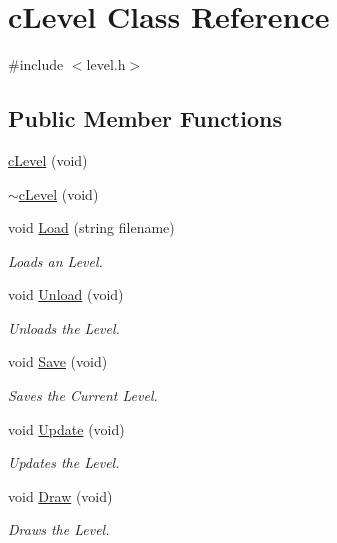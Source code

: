\hypertarget{classc_level}{\section{c\-Level Class Reference}
\label{classc_level}
}


{\ttfamily \#include $<$level.\-h$>$}

\subsection*{Public Member Functions}
\begin{DoxyCompactItemize}
\item 
\hyperlink{classc_level_a9a676d8850a8e55f88edc0630b3576d6}{c\-Level} (void)
\item 
\hyperlink{classc_level_ae4a0effc558ff476321a1d43bc88fd23}{$\sim$c\-Level} (void)
\item 
void \hyperlink{classc_level_a0585e5ce66c81057bc12da8e572f1cc4}{Load} (string filename)
\begin{DoxyCompactList}\small\item\em Loads an Level. \end{DoxyCompactList}\item 
void \hyperlink{classc_level_abe150afdc2a9fdf7a0df8d8b71cdf08e}{Unload} (void)
\begin{DoxyCompactList}\small\item\em Unloads the Level. \end{DoxyCompactList}\item 
void \hyperlink{classc_level_ac73a29116c6d48a559dee99af531f3b4}{Save} (void)
\begin{DoxyCompactList}\small\item\em Saves the Current Level. \end{DoxyCompactList}\item 
void \hyperlink{classc_level_a8d2f8db27146af4302c78a94eaea5024}{Update} (void)
\begin{DoxyCompactList}\small\item\em Updates the Level. \end{DoxyCompactList}\item 
void \hyperlink{classc_level_a16aafe3cb222333629eeb67e61ca55ca}{Draw} (void)
\begin{DoxyCompactList}\small\item\em Draws the Level. \end{DoxyCompactList}\end{DoxyCompactItemize}
